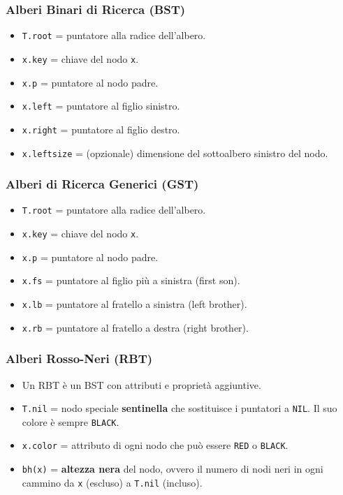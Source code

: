 \subsubsection{Alberi Binari di Ricerca (BST)}
\begin{itemize}
    \item \texttt{T.root} = puntatore alla radice dell'albero.
    \item \texttt{x.key} = chiave del nodo \texttt{x}.
    \item \texttt{x.p} = puntatore al nodo padre.
    \item \texttt{x.left} = puntatore al figlio sinistro.
    \item \texttt{x.right} = puntatore al figlio destro.
    \item \texttt{x.leftsize} = (opzionale) dimensione del sottoalbero sinistro del nodo.
\end{itemize}

\subsubsection{Alberi di Ricerca Generici (GST)}
\begin{itemize}
    \item \texttt{T.root} = puntatore alla radice dell'albero.
    \item \texttt{x.key} = chiave del nodo \texttt{x}.
    \item \texttt{x.p} = puntatore al nodo padre.
    \item \texttt{x.fs} = puntatore al figlio più a sinistra (first son).
    \item \texttt{x.lb} = puntatore al fratello a sinistra (left brother).
    \item \texttt{x.rb} = puntatore al fratello a destra (right brother).
\end{itemize}

\subsubsection{Alberi Rosso-Neri (RBT)}
\begin{itemize}
    \item Un RBT è un BST con attributi e proprietà aggiuntive.
    \item \texttt{T.nil} = nodo speciale \textbf{sentinella} che sostituisce i puntatori a \texttt{NIL}. Il suo colore è sempre \texttt{BLACK}.
    \item \texttt{x.color} = attributo di ogni nodo che può essere \texttt{RED} o \texttt{BLACK}.
    \item \texttt{bh(x)} = \textbf{altezza nera} del nodo, ovvero il numero di nodi neri in ogni cammino da \texttt{x} (escluso) a \texttt{T.nil} (incluso).
\end{itemize}

